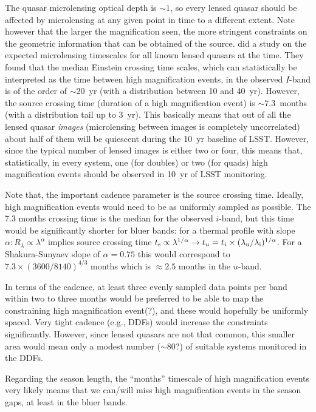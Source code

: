 The quasar microlensing optical depth is $\sim1$, so every lensed quasar should 
be affected by microlensing at any given point in time to a different extent. 
Note however that the larger the magnification seen, the more stringent 
constraints on the geometric information that can be obtained of the source. 
\citet{MosqueraandKochanek2011} did a study on the expected microlensing 
timescales for all known lensed quasars at the time. They found that the median 
Einstein crossing time scales, which can statistically be interpreted as the 
time between high magnification events, in the observed $I$-band is of the order 
of $\sim20$~yr (with a distribution between 10 and 40~yr). However, the source 
crossing time (duration of a high magnification event) is $\sim7.3$~months (with 
a distribution tail up to 3~yr). This basically means that out of all the lensed 
quasar {\em images} (microlensing between images is completely uncorrelated) 
about half of them will be quiescent during the 10~yr baseline of LSST. However, 
since the typical number of lensed images is either two or four, this means 
that, statistically, in every system, one (for doubles) or two (for quads) high 
magnification events should be observed in 10~yr of LSST monitoring. 

Note that, the important cadence parameter is the source crossing time. Ideally, 
high magnification events would need to be as uniformly sampled as possible. The 
7.3 months crossing time is the median for the observed $i$-band, but this time 
would be significantly shorter for bluer bands: for a thermal profile with slope 
$\alpha: R_\lambda \propto \lambda^\alpha$ implies source crossing time $t_{\rm 
s} \propto \lambda^{1/\alpha} \rightarrow t_u=t_i \times (\lambda_{\rm u} / 
\lambda_{\rm i})^{1/\alpha}$. For a Shakura-Sunyaev slope of $\alpha=0.75$ this 
would correspond to $7.3 \times (3600/8140)^{4/3}$ months which is $\approx 2.5$ 
months in the $u$-band.


In terms of the cadence, at least three evenly sampled data points per band 
within two to three months would be preferred to be able to map the constraining 
high magnification event(?), and these would hopefully be uniformly spaced. Very 
tight cadence (e.g., DDFs) would increase the constraints significantly. 
However, since lensed quasars are not that common, this smaller area would mean 
only a modest number ($\sim80$?) of suitable systems monitored in the DDFs.

Regarding the season length, the ``months'' timescale of high
magnification events very likely means that we can/will miss high
magnification events in the season gaps, at least in the bluer bands.

